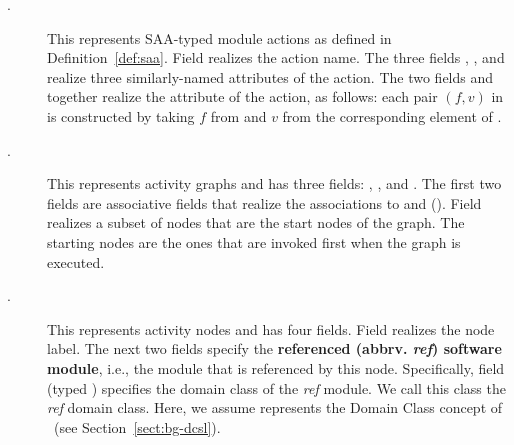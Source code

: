 \begin{description}
\item[.] This represents SAA-typed module actions as defined in Definition~\ref{def:saa}. Field  realizes the action name. The three fields , , and  realize three similarly-named attributes of the action.
%
The two fields  and    together realize the attribute  of the action, as follows: each pair $ (f,v) $ in  is constructed by taking $f$ from  and $v$ from the corresponding element of .
%
\item[.] This represents activity graphs and has three fields: , , and . The first two fields are associative fields that realize the associations to  and  (\resp). Field  realizes a subset of nodes that are the start nodes of the graph. The starting nodes are the ones that are invoked first when the graph is executed.
%
\item[.] This represents activity nodes and has four fields. Field  realizes the node label. 
The next two fields specify the \textbf{referenced (abbrv. \textit{ref}) software module}, i.e., the module that is referenced by this node. Specifically, field  (typed ) specifies the domain class of the \textit{ref} module. We call this class the \textit{ref} domain class. Here, we assume  represents the Domain Class concept of \dcsl~(see Section~\ref{sect:bg-dcsl}).

\end{description}
